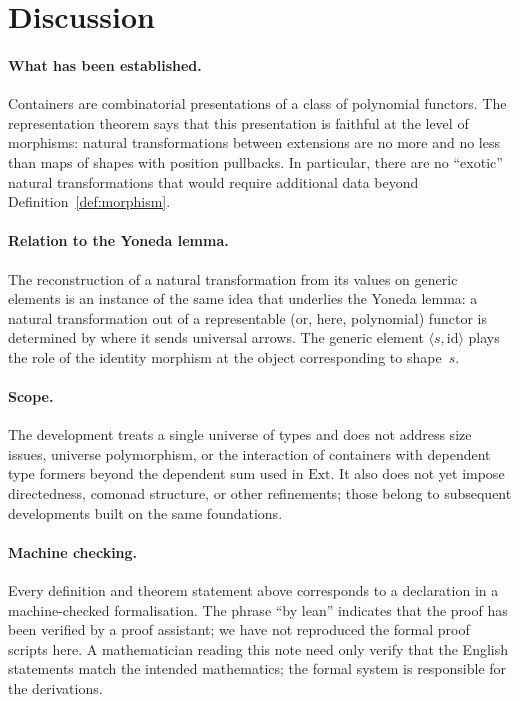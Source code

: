 \documentclass[11pt,a4paper]{article}
\theoremstyle{plain}
\theoremstyle{definition}
\newcommand{\Ext}{\mathrm{Ext}}
\newcommand{\id}{\mathrm{id}}
\begin{document}
\section{Discussion}

\paragraph{What has been established.}
Containers are combinatorial presentations of a class of polynomial functors.
The representation theorem says that this presentation is faithful at the
level of morphisms: natural transformations between extensions are no more and
no less than maps of shapes with position pullbacks. In particular, there are
no ``exotic'' natural transformations that would require additional data
beyond Definition~\ref{def:morphism}.

\paragraph{Relation to the Yoneda lemma.}
The reconstruction of a natural transformation from its values on generic
elements is an instance of the same idea that underlies the Yoneda lemma:
a natural transformation out of a representable (or, here, polynomial) functor
is determined by where it sends universal arrows. The generic element
$\langle s, \id \rangle$ plays the role of the identity morphism at the
object corresponding to shape~$s$.

\paragraph{Scope.}
The development treats a single universe of types and does not address
size issues, universe polymorphism, or the interaction of containers with
dependent type formers beyond the dependent sum used in $\Ext$. It also does
not yet impose directedness, comonad structure, or other refinements; those
belong to subsequent developments built on the same foundations.

\paragraph{Machine checking.}
Every definition and theorem statement above corresponds to a declaration in a
machine-checked formalisation. The phrase ``by lean'' indicates that the proof
has been verified by a proof assistant; we have not reproduced the formal
proof scripts here. A mathematician reading this note need only verify that
the English statements match the intended mathematics; the formal system is
responsible for the derivations.
\end{document}
